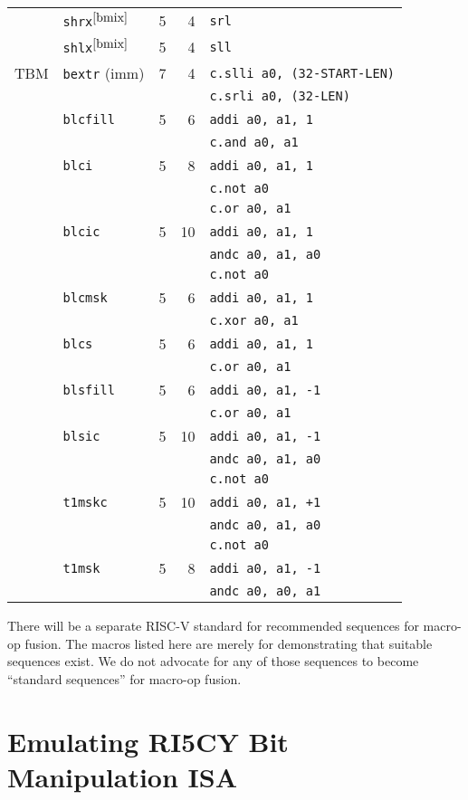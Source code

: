 \begin{longtable}[c]{@{}llrrl@{}}
\cline{2-5}
     & {\tt shrx}$^{\ref{bmix}}$ & 5 &  4 & {\tt srl}\tabularnewline
\cline{2-5}
     & {\tt shlx}$^{\ref{bmix}}$ & 5 &  4 & {\tt sll}\tabularnewline
\midrule
TBM  & {\tt bextr} (imm)      & 7 &  4 & {\tt c.slli a0, (32-START-LEN)}\tabularnewline
     &                        &   &    & {\tt c.srli a0, (32-LEN)}\tabularnewline
\cline{2-5}
     & {\tt blcfill}          & 5 &  6 & {\tt addi a0, a1, 1}\tabularnewline
     &                        &   &    & {\tt c.and a0, a1}\tabularnewline
\cline{2-5}
     & {\tt blci}             & 5 &  8 & {\tt addi a0, a1, 1}\tabularnewline
     &                        &   &    & {\tt c.not a0}\tabularnewline
     &                        &   &    & {\tt c.or a0, a1}\tabularnewline
\cline{2-5}
     & {\tt blcic}            & 5 & 10 & {\tt addi a0, a1, 1}\tabularnewline
     &                        &   &    & {\tt andc a0, a1, a0}\tabularnewline
     &                        &   &    & {\tt c.not a0}\tabularnewline
\cline{2-5}
     & {\tt blcmsk}           & 5 &  6 & {\tt addi a0, a1, 1}\tabularnewline
     &                        &   &    & {\tt c.xor a0, a1}\tabularnewline
\cline{2-5}
     & {\tt blcs}             & 5 &  6 & {\tt addi a0, a1, 1}\tabularnewline
     &                        &   &    & {\tt c.or a0, a1}\tabularnewline
\cline{2-5}
     & {\tt blsfill}          & 5 &  6 & {\tt addi a0, a1, -1}\tabularnewline
     &                        &   &    & {\tt c.or a0, a1}\tabularnewline
\cline{2-5}
     & {\tt blsic}            & 5 & 10 & {\tt addi a0, a1, -1}\tabularnewline
     &                        &   &    & {\tt andc a0, a1, a0}\tabularnewline
     &                        &   &    & {\tt c.not a0}\tabularnewline
\cline{2-5}
     & {\tt t1mskc}           & 5 & 10 & {\tt addi a0, a1, +1}\tabularnewline
     &                        &   &    & {\tt andc a0, a1, a0}\tabularnewline
     &                        &   &    & {\tt c.not a0}\tabularnewline
\cline{2-5}
     & {\tt t1msk}            & 5 &  8 & {\tt addi a0, a1, -1}\tabularnewline
     &                        &   &    & {\tt andc a0, a0, a1}\tabularnewline
\bottomrule
\end{longtable}

There will be a separate RISC-V standard for recommended sequences for macro-op fusion.
The macros listed here are merely for demonstrating that suitable sequences exist. We
do not advocate for any of those sequences to become ``standard sequences'' for macro-op
fusion.

\section{Emulating RI5CY Bit Manipulation ISA}

